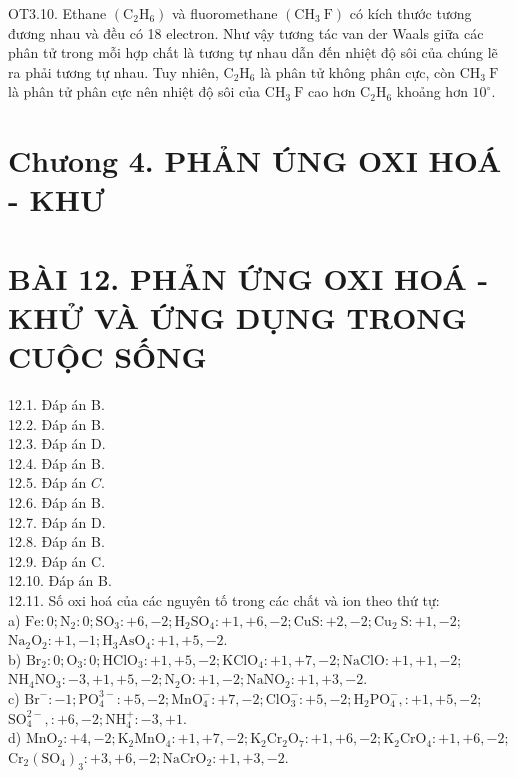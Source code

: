\documentclass[10pt]{article}
\begin{document}
OT3.10. Ethane $\left(\mathrm{C}_{2} \mathrm{H}_{6}\right)$ và fluoromethane $\left(\mathrm{CH}_{3} \mathrm{~F}\right)$ có kích thước tương đương nhau và đều có 18 electron. Như vậy tương tác van der Waals giữa các phân tử trong mỗi hợp chất là tương tự nhau dẫn đến nhiệt độ sôi của chúng lẽ ra phải tương tự nhau. Tuy nhiên, $\mathrm{C}_{2} \mathrm{H}_{6}$ là phân tử không phân cực, còn $\mathrm{CH}_{3} \mathrm{~F}$ là phân tử phân cực nên nhiệt độ sôi của $\mathrm{CH}_{3} \mathrm{~F}$ cao hơn $\mathrm{C}_{2} \mathrm{H}_{6}$ khoảng hơn $10^{\circ}$.

\section*{Chưong 4. PHẢN ÚNG OXI HOÁ - KHƯ}
\section*{BÀI 12. PHẢN ỨNG OXI HOÁ - KHỬ VÀ ỨNG DỤNG TRONG CUỘC SỐNG}
12.1. Đáp án B.\\
12.2. Đáp án B.\\
12.3. Đáp án D.\\
12.4. Đáp án B.\\
12.5. Đáp án $C$.\\
12.6. Đáp án B.\\
12.7. Đáp án D.\\
12.8. Đáp án B.\\
12.9. Đáp án C.\\
12.10. Đáp án B.\\
12.11. Số oxi hoá của các nguyên tố trong các chất và ion theo thứ tự:\\
a) $\mathrm{Fe}: 0 ; \mathrm{N}_{2}: 0 ; \mathrm{SO}_{3}:+6,-2 ; \mathrm{H}_{2} \mathrm{SO}_{4}:+1,+6,-2 ; \mathrm{CuS}:+2,-2 ; \mathrm{Cu}_{2} \mathrm{~S}:+1,-2$; $\mathrm{Na}_{2} \mathrm{O}_{2}:+1,-1 ; \mathrm{H}_{3} \mathrm{AsO}_{4}:+1,+5,-2$.\\
b) $\mathrm{Br}_{2}: 0 ; \mathrm{O}_{3}: 0 ; \mathrm{HClO}_{3}:+1,+5,-2 ; \mathrm{KClO}_{4}:+1,+7,-2 ; \mathrm{NaClO}:+1,+1,-2$; $\mathrm{NH}_{4} \mathrm{NO}_{3}:-3,+1,+5,-2 ; \mathrm{N}_{2} \mathrm{O}:+1,-2 ; \mathrm{NaNO}_{2}:+1,+3,-2$.\\
c) $\mathrm{Br}^{-}:-1 ; \mathrm{PO}_{4}^{3-}:+5,-2 ; \mathrm{MnO}_{4}^{-}:+7,-2 ; \mathrm{ClO}_{3}^{-}:+5,-2 ; \mathrm{H}_{2} \mathrm{PO}_{4}^{-},:+1,+5,-2$; $\mathrm{SO}_{4}^{2-},:+6,-2 ; \mathrm{NH}_{4}^{+}:-3,+1$.\\
d) $\mathrm{MnO}_{2}:+4,-2 ; \mathrm{K}_{2} \mathrm{MnO}_{4}:+1,+7,-2 ; \mathrm{K}_{2} \mathrm{Cr}_{2} \mathrm{O}_{7}:+1,+6,-2 ; \mathrm{K}_{2} \mathrm{CrO}_{4}:+1,+6,-2$; $\mathrm{Cr}_{2}\left(\mathrm{SO}_{4}\right)_{3}:+3,+6,-2 ; \mathrm{NaCrO}_{2}:+1,+3,-2$.\\
\end{document}
